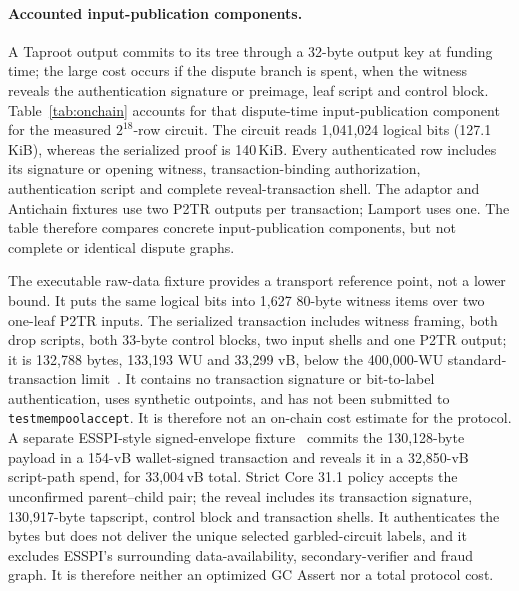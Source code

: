 \documentclass[11pt]{article}
\begin{document}
\paragraph{Accounted input-publication components.} A Taproot output commits to
its tree through a 32-byte output key at funding time; the large cost occurs if
the dispute branch is spent, when the witness reveals the authentication
signature or preimage, leaf script and control block. Table~\ref{tab:onchain}
accounts for that dispute-time input-publication component for the measured
$2^{18}$-row circuit. The circuit reads 1{,}041{,}024 logical bits
(127.1\,KiB), whereas the serialized proof is 140\,KiB. Every authenticated row
includes its signature or opening witness, transaction-binding authorization,
authentication script and complete reveal-transaction shell. The adaptor and
Antichain fixtures use two P2TR outputs per transaction; Lamport uses one. The
table therefore compares concrete
input-publication components, but not complete or identical dispute graphs.

The executable raw-data fixture provides a transport reference point, not a
lower bound. It puts
the same logical bits into 1{,}627 80-byte witness items over two one-leaf P2TR
inputs. The serialized transaction includes witness framing, both drop scripts,
both 33-byte control blocks, two input shells and one P2TR output; it is
132{,}788 bytes, 133{,}193 WU and 33{,}299 vB, below the 400{,}000-WU
standard-transaction limit~\cite{bitcoincorepolicy}. It contains no transaction
signature or bit-to-label authentication, uses synthetic outpoints, and has not
been submitted to \texttt{testmempoolaccept}. It is therefore not an on-chain
cost estimate for the protocol. A separate ESSPI-style signed-envelope
fixture~\cite{esspi25} commits the 130{,}128-byte payload in a 154-vB
wallet-signed transaction and reveals it in a 32{,}850-vB script-path spend,
for 33{,}004\,vB total. Strict Core 31.1 policy accepts the unconfirmed
parent--child pair; the reveal includes its transaction signature, 130{,}917-byte
tapscript, control block and transaction shells. It authenticates the bytes but
does not deliver the unique selected garbled-circuit labels, and it excludes
ESSPI's surrounding data-availability, secondary-verifier and fraud graph. It
is therefore neither an optimized GC Assert nor a total protocol cost.
\end{document}
